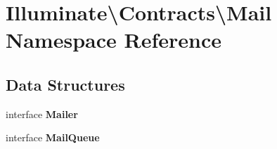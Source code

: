 \section{Illuminate\textbackslash{}Contracts\textbackslash{}Mail Namespace Reference}
\label{namespace_illuminate_1_1_contracts_1_1_mail}
\subsection*{Data Structures}
\begin{DoxyCompactItemize}
\item 
interface {\bf Mailer}
\item 
interface {\bf Mail\+Queue}
\end{DoxyCompactItemize}
